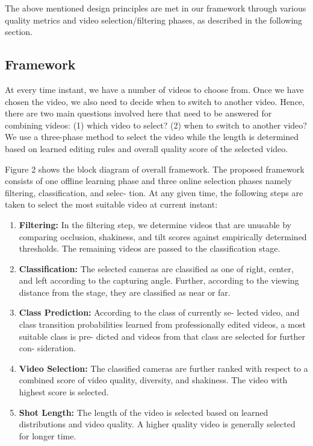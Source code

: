 \documentclass[conference]{IEEEtran}
\begin{document}
The above mentioned design principles are met in our framework through various quality metrics and video selection/filtering phases, as described in the following section.

\subsection{Framework}
At every time instant, we have a number of videos to choose
from. Once we have chosen the video, we also need to decide when
to switch to another video. Hence, there are two main questions
involved here that need to be answered for combining videos: (1)
which video to select? (2) when to switch to another video? We
use a three-phase method to select the video while the length is
determined based on learned editing rules and overall quality score
of the selected video.

Figure 2 shows the block diagram of overall framework. The
proposed framework consists of one offline learning phase and three online selection phases namely filtering, classification, and selec-
tion. At any given time, the following steps are taken to select the
most suitable video at current instant:

\begin{enumerate}
    \item \textbf{Filtering:} In the filtering step, we determine videos that are
unusable by comparing occlusion, shakiness, and tilt scores
against empirically determined thresholds. The remaining
videos are passed to the classification stage.
    \item \textbf{Classification: }The selected cameras are classified as one
of right, center, and left according to the capturing angle.
Further, according to the viewing distance from the stage,
they are classified as near or far.
    \item \textbf{Class Prediction: }According to the class of currently se-
lected video, and class transition probabilities learned from
professionally edited videos, a most suitable class is pre-
dicted and videos from that class are selected for further con-
sideration.
    \item \textbf{Video Selection: }The classified cameras are further ranked
with respect to a combined score of video quality, diversity,
and shakiness. The video with highest score is selected.
    \item \textbf{Shot Length: }The length of the video is selected based on
learned distributions and video quality. A higher quality video
is generally selected for longer time.
\end{enumerate}
\end{document}

